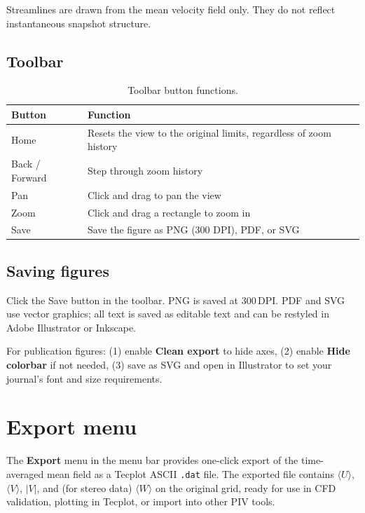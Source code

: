 \documentclass[11pt, a4paper]{report}
\newcommand{\uipth}[1]{\textbf{\textcolor{upblue}{#1}}}
\begin{document}
\begin{notebox}
Streamlines are drawn from the mean velocity field only. They do not reflect instantaneous snapshot structure.
\end{notebox}

\subsection{Toolbar}

\begin{table}[htbp]
\centering
\caption{Toolbar button functions.}
\begin{tabular}{ll}
\toprule
\textbf{Button} & \textbf{Function} \\
\midrule
Home           & Resets the view to the original limits, regardless of zoom history \\
Back / Forward & Step through zoom history \\
Pan            & Click and drag to pan the view \\
Zoom           & Click and drag a rectangle to zoom in \\
Save           & Save the figure as PNG (300 DPI), PDF, or SVG \\
\bottomrule
\end{tabular}
\end{table}

\subsection{Saving figures}

Click the Save button in the toolbar. PNG is saved at 300\,DPI. PDF and SVG use vector graphics; all text is saved as editable text and can be restyled in Adobe Illustrator or Inkscape.

\begin{tipbox}
For publication figures: (1) enable \uipth{Clean export} to hide axes, (2) enable \uipth{Hide colorbar} if not needed, (3) save as SVG and open in Illustrator to set your journal's font and size requirements.
\end{tipbox}

\section{Export menu}

The \uipth{Export} menu in the menu bar provides one-click export of the time-averaged mean field as a Tecplot ASCII \texttt{.dat} file. The exported file contains $\langle U \rangle$, $\langle V \rangle$, $|V|$, and (for stereo data) $\langle W \rangle$ on the original grid, ready for use in CFD validation, plotting in Tecplot, or import into other PIV tools.
\end{document}
